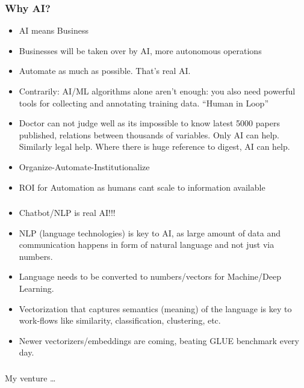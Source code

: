\begin{frame}[fragile]\frametitle{Why AI?}
\begin{itemize}
\item AI means Business
\item Businesses will be taken over by AI, more autonomous operations
\item Automate as much as possible. That's real AI. 
\item Contrarily: AI/ML algorithms alone aren’t enough: you also need powerful tools for collecting and annotating training data. ``Human in Loop''
\item Doctor can not judge well as its impossible to know latest 5000 papers published, relations between thousands of variables. Only AI can help. Similarly legal help. Where there is huge reference to digest, AI can help.
\item Organize-Automate-Institutionalize
\item ROI for Automation as humans cant scale to information available
\end{itemize}
\end{frame}

\begin{frame}[fragile]\frametitle{}
\begin{itemize}
\item Chatbot/NLP is real AI!!!
\item NLP (language technologies) is key to AI, as large amount of data and communication
happens in form of natural language and not just via numbers.
\item Language needs to be converted to numbers/vectors for Machine/Deep Learning.
\item Vectorization that captures semantics (meaning) of the language is key to work-flows like similarity, classification, clustering, etc.
\item Newer vectorizers/embeddings are coming, beating GLUE benchmark every day.
\end{itemize}
\end{frame}


\begin{frame}[fragile]\frametitle{}
\begin{center}
{\Large My venture \ldots}
\end{center}
\end{frame}


